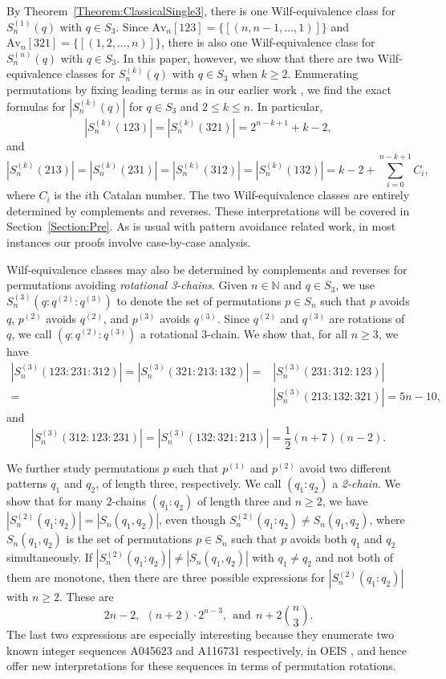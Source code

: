 \documentclass[11pt]{article}
\theoremstyle{definition}
\newcommand{\half}{{\textstyle\frac12}}
\numberwithin{equation}{section}
\begin{document}
By Theorem~\ref{Theorem:ClassicalSingle3}, there is one Wilf-equivalence class for $S_n^{(1)}(q)$ with $q\in S_3$. 
Since $\text{Av}_n[123]=\{[(n,n-1,\ldots,1)]\}$ and $
\text{Av}_n[321]=\{[(1,2,\ldots,n)]\}$, there is also one Wilf-equivalence class for $S_n^{(n)}(q)$ with $q\in S_3$. In this paper, however, we show that there are two Wilf-equivalence classes for $S_n^{(k)}(q)$ with $q\in S_3$ when $k\geq2$. 
Enumerating permutations by fixing leading terms as in our earlier work \cite{EGY2026}, 
we find the exact formulas for $|S_n^{(k)}(q)|$ for $q\in S_3$ and $2\leq k\leq n$. In particular,
\[
|S_n^{(k)}(123)|=|S_n^{(k)}(321)|=2^{n-k+1}+k-2,
\]
and
\[
|S_n^{(k)}(213)|=|S_n^{(k)}(231)|=|S_n^{(k)}(312)|=|S_n^{(k)}(132)|=k-2+\sum_{i=0}^{n-k+1}C_i,
\]
where $C_i$ is the $i$th Catalan number. The two Wilf-equivalence classes are entirely determined by complements 
and reverses. These interpretations will be covered in Section~\ref{Section:Pre}. As is usual with pattern avoidance related work, in most instances our proofs involve case-by-case analysis.

Wilf-equivalence classes may also be determined by complements and reverses for permutations avoiding {\it rotational 3-chains}. Given $n\in\mathbb{N}$ and $q\in S_3$, we use $S_n^{(3)}(q:q^{(2)}:q^{(3)})$ to denote the set of permutations $p\in S_n$ such that $p$ avoids $q$, $p^{(2)}$ avoids $q^{(2)}$, and $p^{(3)}$ avoids $q^{(3)}$. Since $q^{(2)}$ and $q^{(3)}$ are rotations of $q$, we call $(q:q^{(2)}:q^{(3)})$ a rotational 3-chain. We show that, for all $n\geq3$, we have
\[
\begin{split}
    |S_n^{(3)}(123:231:312)|=|S_n^{(3)}(321:213:132)|=&|S_n^{(3)}(231:312:123)|\\=&|S_n^{(3)}(213:132:321)|=5n-10,
\end{split}
\]
and
\[
    |S_n^{(3)}(312:123:231)|=|S_n^{(3)}(132:321:213)|=\half (n+7)(n-2).
\]

We further study permutations $p$ such that $p^{(1)}$ and $p^{(2)}$ avoid two different patterns $q_1$ and $q_2$, of length three, respectively. We call $(q_1:q_2)$ a \textit{2-chain}. 
We show that for many 2-chains $(q_1:q_2)$ of length three and $n\geq2$, we have $|S_n^{(2)}(q_1:q_2)|=|S_n(q_1,q_2)|$, 
even though $S_n^{(2)}(q_1:q_2)\neq S_n(q_1,q_2)$, where $S_n(q_1,q_2)$ is the set of permutations $p\in S_n$ such that $p$ avoids both $q_1$ and $q_2$ simultaneously. If $|S_n^{(2)}(q_1:q_2)|\neq |S_n(q_1,q_2)|$ with $q_1\neq q_2$ and not both of them are monotone, then there are three possible expressions for $|S_n^{(2)}(q_1:q_2)|$ with $n\geq2$. 
These are 
\[
2n-2, ~~(n+2)\cdot2^{n-3}, ~~\mbox{and} ~~ n + 2 \binom{n}{3}. 
\]
The last two expressions are especially interesting because they enumerate two known 
integer sequences A045623 and A116731 respectively, in OEIS \cite{OEIS}, and hence offer new interpretations 
for these sequences in terms of permutation rotations.
\end{document}

